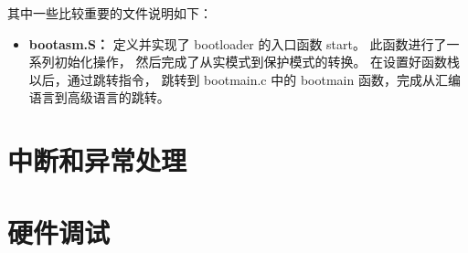 其中一些比较重要的文件说明如下：
\begin{footnotesize}
\begin{itemize}
    \item %
        {\bf{bootasm.S：}}
        定义并实现了 bootloader 的入口函数 start。
        此函数进行了一系列初始化操作，
        然后完成了从实模式到保护模式的转换。
        在设置好函数栈以后，通过跳转指令，
        跳转到 bootmain.c 中的 bootmain 函数，完成从汇编语言到高级语言的跳转。
\end{itemize}
\end{footnotesize}

\chapter{中断和异常处理}

\chapter{硬件调试}
